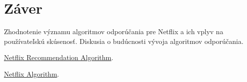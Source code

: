\documentclass[10pt,twoside,slovak,a4paper]{article}
\begin{document}
\section{Záver}
Zhodnotenie významu algoritmov odporúčania pre Netflix a ich vplyv na používateľskú skúsenosť.
Diskusia o budúcnosti vývoja algoritmov odporúčania.
\begin{thebibliography}{9}

\href{https://stratoflow.com/how-netflix-recommendation-algorithm-work/}{Netflix Recommendation Algorithm}.  

\href{https://recostream.com/blog/recommendation-system-netflix}{Netflix Algorithm}.  

\end{thebibliography}
\end{document}
